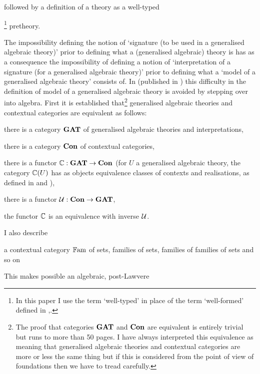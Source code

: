 followed by a definition of a theory as a well-typed{\footnote{In this paper I use the term `well-typed' in place of the term `well-formed' defined in \cite{Cartmell78},\cite{Cartmell86}.} pretheory. 

\note The impossibility defining the notion of `signature (to be used in a generalised algebraic theory)' prior to defining
what a (generalised algebraic) theory is has as a consequence
the impossibility of defining a notion of `interpretation of a signature (for a generalised algebraic theory)' prior to 
defining what a `model of a generalised algebraic theory' consists of.  In \cite{Cartmell78} (published in \cite{Cartmell86}) this difficulty
in the definition of model of a generalised algebraic theory is avoided by stepping over into algebra.
First  it is established that\footnote{
The proof that categories $\catGAT$ and $\catCon$ are equivalent  is entirely trivial but runs to more than 50 pages. I have always interpreted this equivalence as meaning that generalised algebraic theories and contextual categories are more or less the same thing but if this is considered from the point of view of foundations then we have to tread carefully.} 
 generalised algebraic theories and contextual categories are equivalent as follows: 
\noindent \label{ccgatequivalence}
\begin{point}
there is a category $\catGAT$ of generalised algebraic theories and interpretations,
\end{point}
\begin{point}
there is a category $\catCon$ of contextual categories,
\end{point}
\begin{point}
there is a functor $\ccat[C]: \catGAT \morph \catCon$  (for $U$ a generalised algebraic theory, the category $\ccat[C](U)$ 
has as objects equivalence classes of contexts and realisations, as defined 
in \cite{Cartmell78} and  \cite{Cartmell86}), 
\end{point}
\begin{point}
there is a functor $\gat[U]:\catCon \morph \catGAT$,
\end{point}
\begin{point}
the functor $\ccat[C]$ is an equivalence with inverse $\gat[U]$.
\end{point}
I also describe 
\begin{point}
a contextual category $\Fam$ of sets, families of sets, families of families of sets and so on 
\end{point}
This makes possible an  algebraic, post-Lawvere
}
